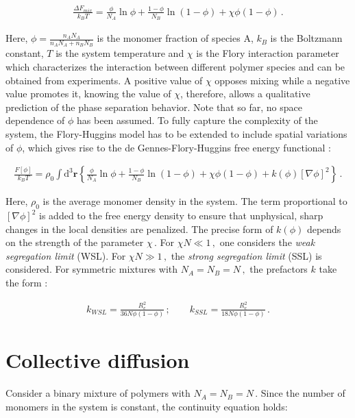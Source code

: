 \documentclass[bachelor,       %
               twoside,        %
               BCOR10mm,       %
                ngerman,english  %
               ]{GAUBM}
\begin{document}
\begin{align}
  \frac{\Delta F_{mix}}{k_BT}=\frac{\phi}{N_A}\ln\phi+\frac{1-\phi}{N_B}\ln(1-\phi)+\chi\phi(1-\phi)\,.
\end{align}

Here, $\phi=\frac{n_AN_A}{n_AN_A+n_BN_B}$ is the monomer fraction of species A, $k_B$ is the Boltzmann constant, $T$ is the system temperature and $\chi$ is the Flory interaction parameter which characterizes the interaction between different polymer species and can be obtained from experiments. A positive value of $\chi$ opposes mixing while a negative value promotes it, knowing the value of $\chi$, therefore, allows a qualitative prediction of the phase separation behavior. Note that so far, no space dependence of $\phi$ has been assumed. To fully capture the complexity of the system, the Flory-Huggins model has to be extended to include spatial variations of $\phi$, which gives rise to the de Gennes-Flory-Huggins free energy functional  \cite{deGennes80, Reister02}:


\begin{align}
  \frac{F[\phi]}{k_BT}=\rho_0\int \mathrm{d}^3\mathbf{r}\left\{\frac{\phi}{N_A}\ln\phi+\frac{1-\phi}{N_B}\ln(1-\phi)+\chi\phi(1-\phi)+k(\phi)[\nabla\phi]^2\right\}\,.
  \label{eq:flory_fctl}
\end{align}

Here, $\rho_0$ is the average monomer density in the system. The term proportional to $[\nabla\phi]^2$ is added to the free energy density to ensure that unphysical, sharp changes in the local densities are penalized. The precise form of $k(\phi)$ depends on the strength of the parameter $\chi\,$. For $\chi N\ll 1\,,$ one considers the \textit{weak segregation limit} (WSL). For $\chi N\gg 1\,,$ the \textit{strong segregation limit} (SSL) is considered. For symmetric mixtures with $N_A=N_B=N\,,$ the prefactors $k$ take the form \cite{Reister02}:

\begin{align}
  k_{WSL}=\frac{R_e^2}{36N\phi(1-\phi)}\,;\qquad k_{SSL}=\frac{R_e^2}{18N\phi(1-\phi)}\,.
\end{align}


\section{Collective diffusion}

Consider a binary mixture of polymers with $N_A=N_B=N\,$. Since the number of monomers in the system is constant, the continuity equation holds:
\end{document}
